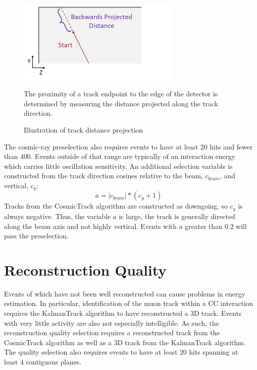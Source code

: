 \begin{figure}
\begin{center}
\includegraphics[width=0.7\textwidth]{figures/selection/backdist.png}
\end{center}
\caption{Illustration of track distance projection}{
The proximity of a track endpoint to the edge of the detector is determined
by measuring the distance projected along the track direction.
}
\label{trackproj}
\end{figure}

The cosmic-ray preselection also requires events to have at least 20 hits
and fewer than 400.  Events outside of that range are typically of an
interaction energy which carries little oscillation sensitivity.  An additional
selection variable is constructed from the track direction cosines relative to
the beam, $c_{beam}$, and vertical, $c_y$:
\begin{equation}
a = |c_{beam}| * (c_y + 1)
\end{equation}
Tracks from the CosmicTrack algorithm are constructed as downgoing, so $c_y$ is
always negative.  Thus, the variable $a$ is large, the track is generally
directed along the beam axis and not highly vertical.
Events with $a$ greater than 0.2 will pass the preselection.

\section{Reconstruction Quality}

Events of which have not been well reconstructed can cause problems
in energy estimation.
In particular, identification of the muon track within a \numu CC interaction
requires the KalmanTrack algorithm to have reconstructed a 3D track.
Events with very little activity are also not especially intelligible.
As such, the reconstruction quality selection requires a reconstructed track
from the CosmicTrack algorithm as well as a 3D track from the KalmanTrack
algorithm.
The quality selection also requires events to have at least 20 hits
spanning at least 4 contiguous planes.

